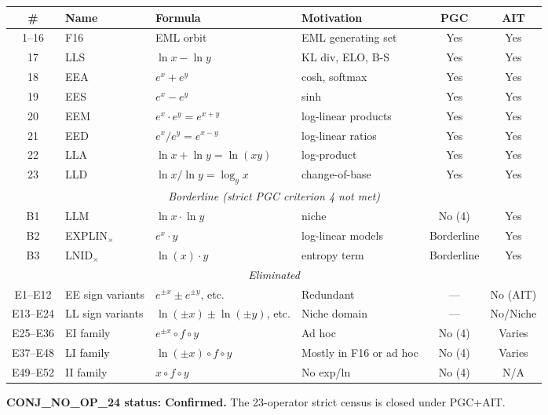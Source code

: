 \documentclass[11pt]{article}
\begin{document}
\begin{longtable}{clllcc}
\toprule
\# & Name & Formula & Motivation & PGC & AIT \\
\midrule
1--16  & F16 & EML orbit & EML generating set & Yes & Yes \\
17     & LLS  & $\ln x - \ln y$ & KL div, ELO, B-S & Yes & Yes \\
18     & EEA  & $e^x + e^y$     & cosh, softmax & Yes & Yes \\
19     & EES  & $e^x - e^y$     & sinh & Yes & Yes \\
20     & EEM  & $e^x \cdot e^y = e^{x+y}$ & log-linear products & Yes & Yes \\
21     & EED  & $e^x / e^y = e^{x-y}$ & log-linear ratios & Yes & Yes \\
22     & LLA  & $\ln x + \ln y = \ln(xy)$ & log-product & Yes & Yes \\
23     & LLD  & $\ln x / \ln y = \log_y x$ & change-of-base & Yes & Yes \\
\midrule
\multicolumn{6}{c}{\textit{Borderline (strict PGC criterion 4 not met)}} \\
\midrule
B1  & LLM & $\ln x \cdot \ln y$ & niche & No (4) & Yes \\
B2  & EXPLIN$_\times$ & $e^x \cdot y$ & log-linear models & Borderline & Yes \\
B3  & LNID$_\times$ & $\ln(x) \cdot y$ & entropy term & Borderline & Yes \\
\midrule
\multicolumn{6}{c}{\textit{Eliminated}} \\
\midrule
E1--E12 & EE sign variants & $e^{\pm x} \pm e^{\pm y}$, etc. & Redundant & --- & No (AIT) \\
E13--E24 & LL sign variants & $\ln(\pm x) \pm \ln(\pm y)$, etc. & Niche domain & --- & No/Niche \\
E25--E36 & EI family & $e^{\pm x} \circ f \circ y$ & Ad hoc & No (4) & Varies \\
E37--E48 & LI family & $\ln(\pm x) \circ f \circ y$ & Mostly in F16 or ad hoc & No (4) & Varies \\
E49--E52 & II family & $x \circ f \circ y$ & No exp/ln & No (4) & N/A \\
\bottomrule
\end{longtable}

\noindent \textbf{CONJ\_NO\_OP\_24 status: Confirmed.}
The 23-operator strict census is closed under PGC+AIT.
\end{document}
